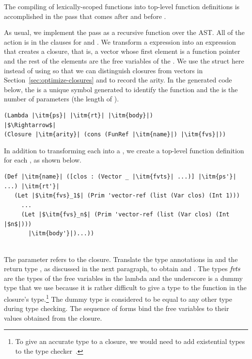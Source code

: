 \documentclass[11pt]{book}
\begin{document}
The compiling of lexically-scoped functions into top-level function
definitions is accomplished in the pass 
that comes after  and before
. 

As usual, we implement the pass as a recursive function over the
AST. All of the action is in the clauses for  and
. We transform a  expression into an expression
that creates a closure, that is, a vector whose first element is a
function pointer and the rest of the elements are the free variables
of the . We use the struct  here instead of
using  so that we can distinguish closures from vectors
in Section~\ref{sec:optimize-closures} and to record the arity.  In
the generated code below, the  is a unique symbol generated
to identify the function and the  is the number of
parameters (the length of ).
\begin{lstlisting}
(Lambda |\itm{ps}| |\itm{rt}| |\itm{body}|)
|$\Rightarrow$|
(Closure |\itm{arity}| (cons (FunRef |\itm{name}|) |\itm{fvs}|))
\end{lstlisting}
In addition to transforming each  into a , we
create a top-level function definition for each , as
shown below.\\
\begin{minipage}{0.8\textwidth}
\begin{lstlisting}
(Def |\itm{name}| ([clos : (Vector _ |\itm{fvts}| ...)] |\itm{ps'}| ...) |\itm{rt'}|
   (Let |$\itm{fvs}_1$| (Prim 'vector-ref (list (Var clos) (Int 1)))
     ...
     (Let |$\itm{fvs}_n$| (Prim 'vector-ref (list (Var clos) (Int |$n$|)))
       |\itm{body'}|)...))
\end{lstlisting}
\end{minipage}\\
The  parameter refers to the closure.  Translate the type
annotations in  and the return type , as discussed in
the next paragraph, to obtain  and .  The types
$\mathit{fvts}$ are the types of the free variables in the lambda and the
underscore \code{\_} is a dummy type that we use because it is rather
difficult to give a type to the function in the closure's
type.\footnote{To give an accurate type to a closure, we would need to
  add existential types to the type checker~\citep{Minamide:1996ys}.}
The dummy type is considered to be equal to any other type during type
checking.  The sequence of  forms bind the free variables to
their values obtained from the closure.
\end{document}
